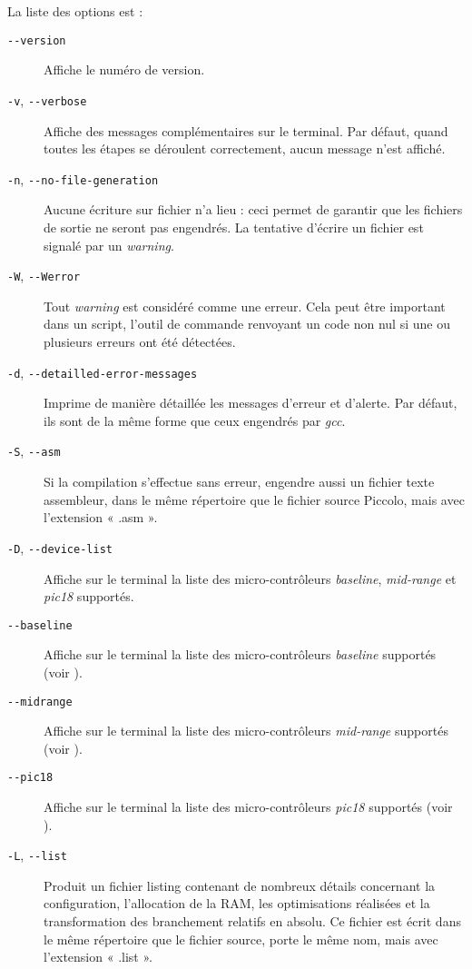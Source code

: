 La liste des options est :
\begin{description}
  \item[\texttt{-{-}version}] Affiche le numéro de version.
  \item[\texttt{-v}, \texttt{-{-}verbose}] Affiche des messages complémentaires sur le terminal. Par défaut, quand toutes les étapes se déroulent correctement, aucun message n’est affiché.
  \item[\texttt{-n}, {\tt-{-}no-file-generation}] Aucune écriture sur fichier n’a lieu : ceci permet de garantir que les fichiers de sortie ne seront pas engendrés. La tentative d’écrire un fichier est signalé par un \emph{warning}.
  \item[\texttt{-W}, \texttt{-{-}Werror}] Tout \emph{warning} est considéré comme une erreur. Cela peut être important dans un script, l’outil de commande renvoyant un code non nul si une ou plusieurs erreurs ont été détectées.
  \item[\texttt{-d}, \texttt{-{-}detailled-error-messages}] Imprime de manière détaillée les messages d’erreur et d’alerte. Par défaut, ils sont de la même forme que ceux engendrés par \emph{gcc}.
  \item[\texttt{-S}, \texttt{-{-}asm}] Si la compilation s’effectue sans erreur, engendre aussi un fichier texte assembleur, dans le même répertoire que le fichier source Piccolo, mais avec l’extension « .asm ».
  \item[\texttt{-D}, \texttt{-{-}device-list}] Affiche sur le terminal la liste des micro-contrôleurs \emph{baseline}, \emph{mid-range} et \emph{pic18} supportés.
  \item[\texttt{-{-}baseline}] Affiche sur le terminal la liste des micro-contrôleurs \emph{baseline} supportés (voir ).
  \item[\texttt{-{-}midrange}] Affiche sur le terminal la liste des micro-contrôleurs \emph{mid-range} supportés (voir ).
  \item[\texttt{-{-}pic18}] Affiche sur le terminal la liste des micro-contrôleurs \emph{pic18} supportés (voir ).
  \item[\texttt{-L}, \texttt{-{-}list}] Produit un fichier listing contenant de nombreux détails concernant la configuration, l’allocation de la RAM, les optimisations réalisées et la transformation des branchement relatifs en absolu. Ce fichier est écrit dans le même répertoire que le fichier source, porte le même nom, mais avec l’extension « .list ».

\end{description}
